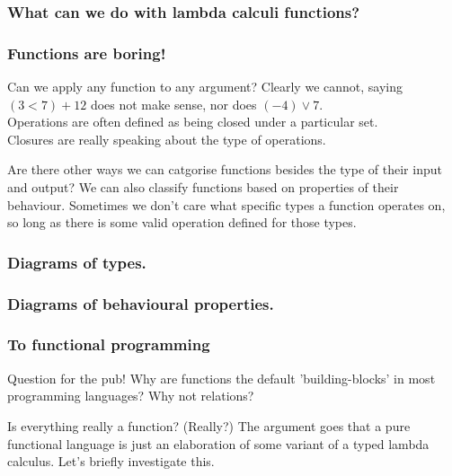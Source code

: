 \documentclass
  [hyperref={colorlinks = true,linkcolor = blue, 
             citecolor = blue, urlcolor = blue}
  ]{beamer}
\begin{document}
\begin{frame}[fragile]
\frametitle{What can we do with lambda calculi functions?}
\end{frame}

\begin{frame}[fragile]
\frametitle{Functions are boring!}
  \begin{block}{Can we apply any function to any argument?}
  Clearly we cannot, saying $(3 < 7) + 12$ does not make
  sense, nor does $ (-4) \lor 7$. 
  \\ Operations are often defined as being closed under 
  a particular set. \\
  Closures are really speaking about the type of operations.
  \end{block}
  \begin{block}{Are there other ways we can catgorise
    functions besides the type of their input and output?}
  We can also classify functions based on properties of their
  behaviour. Sometimes we don't care what specific types
  a function operates on, so long as there is some valid
  operation defined for those types.
  \end{block}
\end{frame}

\begin{frame}[fragile]
\frametitle{Diagrams of types.}
\end{frame}

\begin{frame}[fragile]
\frametitle{Diagrams of behavioural properties.}
\end{frame}

\begin{frame}[fragile]
\frametitle{To functional programming}
\begin{block}{Question for the pub!}
Why are functions the default 'building-blocks' in most
programming languages? Why not relations?
\end{block}

\begin{block}{Is everything really a function? (Really?)}
The argument goes that a pure functional language is just
an elaboration of some variant of a typed lambda calculus.
Let's briefly investigate this.
\end{block}
\end{frame}
\end{document}
